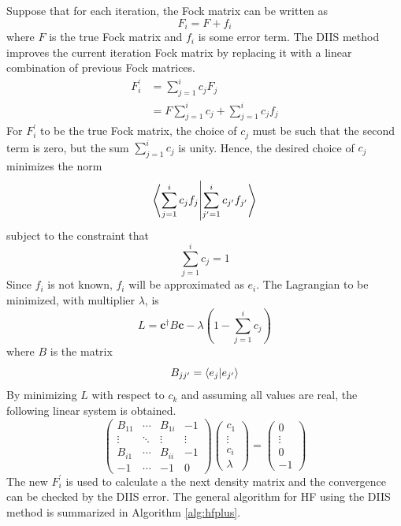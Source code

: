 \documentclass[final,3p,times,twocolumn]{elsarticle}
\begin{document}
Suppose that for each iteration, the Fock matrix can be written as
\begin{equation}
F_i = F + f_i
\end{equation}
where $F$ is the true Fock matrix and $f_i$ is some error term. The DIIS method improves the current iteration Fock matrix by replacing it with a linear combination of previous Fock matrices.
\begin{align} \label{eq:diisnewF}
F_i^\prime & = \sum_{j=1}^i c_j F_j \\
& = F \sum_{j=1}^i c_j + \sum_{j=1}^i c_j f_j
\end{align}
For $F_i^\prime$ to be the true Fock matrix, the choice of $c_j$ must be such that the second term is zero, but the sum $\sum_{j=1}^ic_j$ is unity. Hence, the desired choice of $c_j$ minimizes the norm 
\begin{equation}
\bra{\sum_{j=1}^ic_jf_j}\ket{\sum_{j^\prime=1}^ic_{j^\prime}f_{j^\prime}}
\end{equation}
subject to the constraint that
\begin{equation}
\sum_{j=1}^i c_j = 1
\end{equation}
Since $f_i$ is not known, $f_i$ will be approximated as $e_i$. The Lagrangian to be minimized, with multiplier $\lambda$, is 
\begin{equation}
L = \mathbf{c}^\dagger B \mathbf{c} - \lambda \left(1 - \sum_{j=1}^i c_j\right)
\end{equation}
where $B$ is the matrix
\begin{equation} \label{eq:diisB}
B_{jj^\prime} = \bra{e_j}\ket{e_{j^\prime }}
\end{equation}
By minimizing $L$ with respect to $c_k$ and assuming all values are real,
the following linear system is obtained.
\begin{equation}\label{eq:diislinsys}
\begin{pmatrix} B_{11} & \cdots & B_{1i} & -1 \\
\vdots & \ddots & \vdots & \vdots \\
B_{i1} & \cdots & B_{ii} & -1 \\
-1 & \cdots & -1 & 0 \end{pmatrix}
\begin{pmatrix} c_1 \\ \vdots \\ c_i \\ \lambda \end{pmatrix} = \begin{pmatrix} 0 \\ \vdots \\ 0 \\ -1 \end{pmatrix}
\end{equation}
The new $F_i^\prime$ is used to calculate a the next density matrix and the convergence can be checked by the DIIS error. The general algorithm for HF using the DIIS method is summarized in Algorithm \ref{alg:hfplus}.
\end{document}
